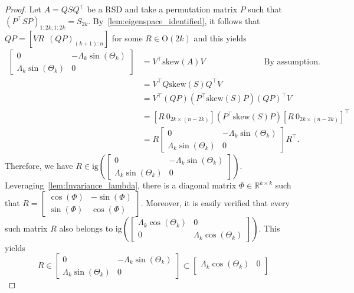 \documentclass[10pt,twoside,dvipsnames]{siamart1116}
\numberwithin{algorithm}{section}
\numberwithin{equation}{section}
\begin{document}
	\begin{proof}
	 Let $A=QSQ^\top $ be a RSD and take a permutation matrix $P$ such that $(P^\top SP)_{1:2k,1:2k}=S_{2k}$. By~\cref{lem:eigenspace_identified}, it follows that $QP = [VR\ \ (QP)_{(k+1):n}]$ for some $R\in \mathrm{O}(2k)$ and this yields 
\begin{align*}
	 \begin{bmatrix}
	0&-\Lambda_k\sin(\Theta_k)\\
	 \Lambda_k\sin(\Theta_k)&0
	\end{bmatrix}&= V^\top \mathrm{skew}(A)V\hspace{3cm}\text{By assumption.}\\
	&= V^\top Q\mathrm{skew}(S)Q^\top  V\\
	&= V^\top (QP)(P^\top \mathrm{skew}(S)P)(QP)^\top  V\\
	&= [R\ 0_{2k\times(n-2k)}](P^\top \mathrm{skew}(S)P)[R\ 0_{2k\times(n-2k)}]^\top \\
	  &= R\begin{bmatrix}
	0&-\Lambda_k\sin(\Theta_k)\\
	 \Lambda_k\sin(\Theta_k)&0
	\end{bmatrix}R^\top. 
\end{align*}	  
Therefore, we have $R\in\mathrm{ig}\left(\left[\begin{smallmatrix}
	0&-\Lambda_k\sin(\Theta_k)\\
	 \Lambda_k\sin(\Theta_k)&0
	\end{smallmatrix}\right]\right)$. Leveraging~\cref{lem:Invariance_lambda}, there is a diagonal matrix $\Phi\in\mathbb{R}^{k\times k}$ such that
	$
	 R=\left[\begin{smallmatrix}
		\cos(\Phi)&-\sin(\Phi)\\
		\sin(\Phi)&\cos(\Phi)
	\end{smallmatrix}\right]$.
	Moreover, it is easily verified that every such matrix $R$ also belongs to $\mathrm{ig}\left(\left[\begin{smallmatrix}
		\Lambda_k\cos(\Theta_k)&0\\
		0&\Lambda_k\cos(\Theta_k)
	\end{smallmatrix}\right]\right)$. This yields \begin{equation*}
	R\in\begin{bmatrix}
	0&-\Lambda_k\sin(\Theta_k)\\
	 \Lambda_k\sin(\Theta_k)&0
	\end{bmatrix}\subset \begin{bmatrix}
	\Lambda_k\cos(\Theta_k)&0\\

\end{bmatrix}
\end{equation*}
\end{proof}
\end{document}
